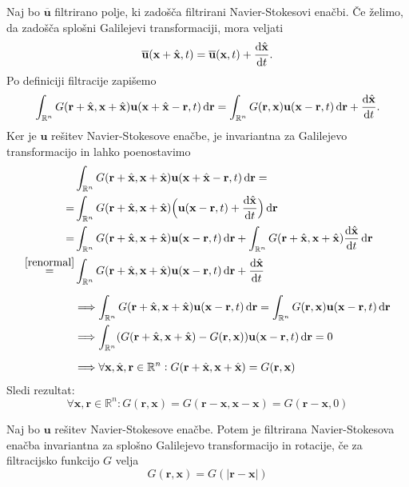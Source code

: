 \documentclass[mat2, tisk]{fmfdelo}
\newcommand{\R}{\mathbb R}
\newcommand{\bd}{\textbf}
\begin{document}
\begin{dokaz}
   Naj bo $\overline{\bd{u}}$ filtrirano polje, ki zadošča filtrirani Navier-Stokesovi enačbi.
  Če želimo, da zadošča splošni Galilejevi transformaciji, mora veljati 
  $$
  \overline{\bd{u}}(\bd{x} + \hat{\bd{x}}, t) = \overline{\bd{u}}(\bd{x}, t) + \frac{\dif \hat{\bd{x}}}{\dif t}.
  $$
  Po definiciji filtracije zapišemo
  \begin{align*}
  \int_{\R^n} G(\bd{r} + \hat{\bd{x}}, \bd{x} + \hat{\bd{x}}) \bd{u}(\bd{x} + \hat{\bd{x}} - \bd{r}, t) \dif \bd{r} = \int_{\R^n} G(\bd{r}, \bd{x}) \bd{u}(\bd{x} - \bd{r}, t)\dif \bd{r} + \frac{\dif \hat{\bd{x}}}{\dif t} .
  \end{align*}
  Ker je $\bd{u}$ rešitev Navier-Stokesove enačbe, je invariantna za Galilejevo transformacijo in lahko poenostavimo 
  \begin{align*}
    &\int_{\R^n} G(\bd{r} + \hat{\bd{x}}, \bd{x} + \hat{\bd{x}}) \bd{u}(\bd{x} + \hat{\bd{x}} - \bd{r}, t) \dif \bd{r} = \\
    =& \int_{\R^n} G(\bd{r} + \hat{\bd{x}}, \bd{x} + \hat{\bd{x}}) \Big(\bd{u}(\bd{x} - \bd{r}, t) + \frac{\dif \hat{\bd{x}}}{\dif t} \Big)\dif \bd{r} \\
    =& \int_{\R^n} G(\bd{r} + \hat{\bd{x}}, \bd{x} + \hat{\bd{x}}) \bd{u}(\bd{x} - \bd{r}, t)\dif \bd{r}  + \int_{\R^n} G(\bd{r} + \hat{\bd{x}}, \bd{x} + \hat{\bd{x}}) \frac{\dif \hat{\bd{x}}}{\dif t} \dif \bd{r}\\
    \stackrel{\ref{renormal}}{=}& \int_{\R^n} G(\bd{r} + \hat{\bd{x}}, \bd{x} + \hat{\bd{x}}) \bd{u}(\bd{x} - \bd{r}, t)\dif \bd{r}  + \frac{\dif \hat{\bd{x}}}{\dif t}\\[2mm]
    &\Longrightarrow \int_{\R^n} G(\bd{r} + \hat{\bd{x}}, \bd{x} + \hat{\bd{x}}) \bd{u}(\bd{x} - \bd{r}, t)\dif \bd{r} = \int_{\R^n} G(\bd{r}, \bd{x}) \bd{u}(\bd{x} - \bd{r}, t)\dif \bd{r}\\
    &\Longrightarrow  \int_{\R^n} (G(\bd{r} + \hat{\bd{x}}, \bd{x} + \hat{\bd{x}}) - G(\bd{r}, \bd{x})) \bd{u}(\bd{x} - \bd{r}, t)\dif \bd{r} = 0\\[2mm]
    &\Longrightarrow \forall \bd{x}, \hat{\bd{x}}, \bd{r} \in \R^n: G(\bd{r} + \hat{\bd{x}}, \bd{x} + \hat{\bd{x}}) = G(\bd{r}, \bd{x})
  \end{align*}
  Sledi rezultat: 
  $$
  \forall \bd{x}, \bd{r} \in \R^n: G(\bd{r}, \bd{x}) = G(\bd{r} - \bd{x}, \bd{x} - \bd{x}) = G(\bd{r} - \bd{x}, 0)
  $$
\end{dokaz}

\begin{lema}
  Naj bo $\bd{u}$ rešitev Navier-Stokesove enačbe. Potem je filtrirana Navier-Stokesova enačba 
  invariantna za splošno Galilejevo transformacijo in rotacije, če za filtracijsko funkcijo $G$ velja 
  $$
  G(\bd{r}, \bd{x}) = G(|\bd{r} - \bd{x}|)
  $$
\end{lema}
\end{document}
